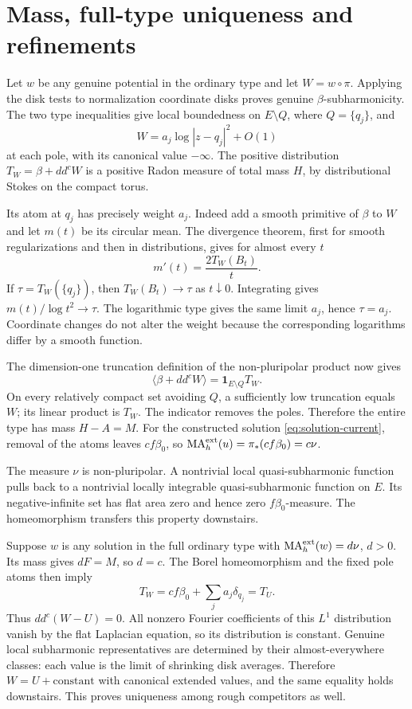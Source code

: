 \documentclass[11pt]{article}
\newcommand{\ddc}{dd^c}
\begin{document}
\section{Mass, full-type uniqueness and refinements}
Let $w$ be any genuine potential in the ordinary type and let
$W=w\circ\pi$. Applying the disk tests to normalization coordinate
disks proves genuine $\beta$-subharmonicity. The two type inequalities
give local boundedness on $E\setminus Q$, where $Q=\{q_j\}$,
and
\[
 W=a_j\log|z-q_j|^2+O(1)
\]
at each pole, with its canonical value $-\infty$. The positive
distribution $T_W=\beta+\ddc W$ is a positive Radon measure of total
mass $H$, by distributional Stokes on the compact torus.

Its atom at $q_j$ has precisely weight $a_j$. Indeed add a smooth
primitive of $\beta$ to $W$ and let $m(t)$ be its circular mean.
The divergence theorem, first for smooth regularizations and then in
distributions, gives for almost every $t$
\[
 m'(t)=\frac{2T_W(B_t)}{t}.
\]
If $\tau=T_W(\{q_j\})$, then $T_W(B_t)\to\tau$ as
$t\downarrow0$. Integrating gives
$m(t)/\log t^2\to\tau$. The logarithmic type gives the same
limit $a_j$, hence $\tau=a_j$. Coordinate changes do not alter the
weight because the corresponding logarithms differ by a smooth function.

The dimension-one truncation definition of the non-pluripolar product
now gives
\[
 \langle\beta+\ddc W\rangle=\mathbf1_{E\setminus Q}T_W.
\]
On every relatively compact set avoiding $Q$, a sufficiently low
truncation equals $W$; its linear product is $T_W$. The indicator
removes the poles. Therefore the entire type has mass $H-A=M$.
For the constructed solution \eqref{eq:solution-current}, removal
of the atoms leaves $cf\beta_0$, so
$\operatorname{MA}^{\rm ext}_h(u)=\pi_*(cf\beta_0)=c\nu$.

The measure $\nu$ is non-pluripolar. A nontrivial local
quasi-subharmonic function pulls back to a nontrivial locally
integrable quasi-subharmonic function on $E$. Its negative-infinite
set has flat area zero and hence zero $f\beta_0$-measure. The
homeomorphism transfers this property downstairs.

Suppose $w$ is any solution in the full ordinary type with
$\operatorname{MA}^{\rm ext}_h(w)=d\nu$, $d>0$. Its mass gives
$dF=M$, so $d=c$. The Borel homeomorphism and the fixed pole atoms
then imply
\[
 T_W=cf\beta_0+\sum_ja_j\delta_{q_j}=T_U.
\]
Thus $\ddc(W-U)=0$. All nonzero Fourier coefficients of this
$L^1$ distribution vanish by the flat Laplacian equation, so its
distribution is constant. Genuine local subharmonic representatives
are determined by their almost-everywhere classes: each value is the
limit of shrinking disk averages. Therefore $W=U+\text{constant}$
with canonical extended values, and the same equality holds downstairs.
This proves uniqueness among rough competitors as well.
\end{document}
